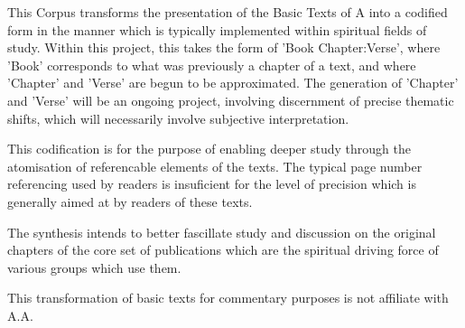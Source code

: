 

\begingroup 
\fontsize{12pt}{11pt}
\selectfont

This Corpus transforms the presentation of the Basic Texts of A 
    into a codified form 
    in the manner which is typically implemented 
    within spiritual fields of study.
Within this project, this takes the form of 'Book Chapter:Verse', 
    where 'Book' corresponds to what was previously a chapter of a text, 
    and where 'Chapter' and 'Verse' are begun to be approximated.
The generation of 'Chapter' and 'Verse' will be an ongoing project,
    involving discernment of precise thematic shifts,
    which will necessarily involve subjective interpretation.

This codification is for the purpose of enabling deeper study 
    through the atomisation of referencable elements of the texts. 
The typical page number referencing used by readers 
    is insuficient for the level of precision 
    which is generally aimed at by readers of these texts.

The synthesis intends to better fascillate study and discussion 
    on the original chapters of the core set of publications 
    which are the spiritual driving force of various groups which use them.

This transformation of basic texts for commentary purposes 
    is not affiliate with A.A.

\endgroup
\clearpage

